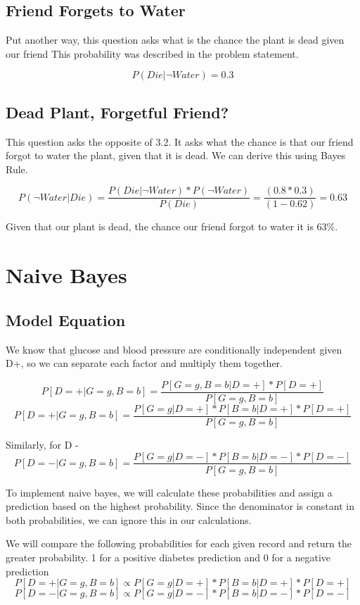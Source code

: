 \documentclass{article}
\begin{document}
\subsection{Friend Forgets to Water}
Put another way, this question asks what is the chance the plant is dead given our friend  This probability was described in the problem statement.

\[P(Die | \neg Water) = 0.3\]

\subsection{Dead Plant, Forgetful Friend?}
This question asks the opposite of 3.2. It asks what the chance is that our friend forgot to water the plant, given that it is dead. We can derive this using Bayes Rule.

\[P(\neg Water | Die) = \frac{P(Die | \neg Water) * P(\neg Water)}{P(Die)} = \frac{(0.8*0.3)}{(1-0.62)} = 0.63\]

Given that our plant is dead, the chance our friend forgot to water it is 63\%.

\newpage
\section{Naive Bayes}

\subsection{Model Equation}
We know that glucose and blood pressure are conditionally independent given D+, so we can separate each factor and multiply them together.

\[P[D=+ |G =g, B=b] = \frac{P[G=g,B=b|D=+] * P[D=+]}{P[G=g, B=b]} \]
\[P[D=+ |G =g, B=b] = \frac{P[G=g|D=+] * P[B=b|D=+] * P[D=+]}{P[G=g, B=b]} \]

Similarly, for D - 
\[P[D=- |G =g, B=b] = \frac{P[G=g|D=-] * P[B=b|D=-] * P[D=-]}{P[G=g, B=b]} \]

To implement naive bayes, we will calculate these probabilities and assign a prediction based on the highest probability. Since the denominator is constant in both probabilities, we can ignore this in our calculations.

We will compare the following probabilities for each given record and return the greater probability. 1 for a positive diabetes prediction and 0 for a negative prediction 
\[P[D=+ |G =g, B=b] \propto P[G=g|D=+] * P[B=b|D=+] * P[D=+] \]
\[P[D=- |G =g, B=b] \propto P[G=g|D=-] * P[B=b|D=-] * P[D=-] \]
\end{document}
